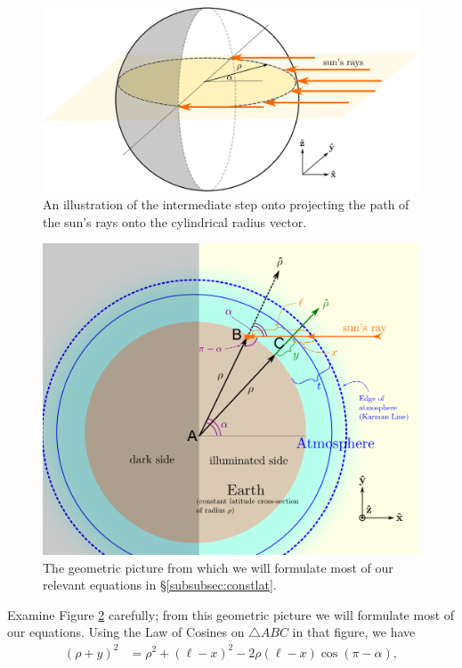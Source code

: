 \documentclass[10pt]{article}
\begin{document}
\begin{figure}[!h]
	\centering
		\includegraphics[width=150mm]{sphere_rhohat_horizontal2.png}
	\caption{An illustration of the intermediate step onto projecting the path of the sun's rays onto the cylindrical radius vector.}
	\label{fig:horiz_crosssect}
\end{figure}

\begin{figure}[!h]
	\centering
		\includegraphics[width=160mm]{sphere_rhohat_fin.png}
	\caption{The geometric picture from which we will formulate most of our relevant equations in \S \ref{subsubsec:constlat}.}
	\label{fig:rho_calc}
\end{figure}


\vspace{10pt}
Examine Figure \ref{fig:rho_calc} carefully; from this geometric picture we will formulate most of our equations. Using the Law of Cosines on $\bigtriangleup ABC$ in that figure, we have
\begin{align} \label{eq:lawofcosines}
(\rho+y)^2 &= \rho^2 + (\ell - x)^2 - 2\rho(\ell - x)\cos(\pi - \alpha),
\end{align}
\end{document}
